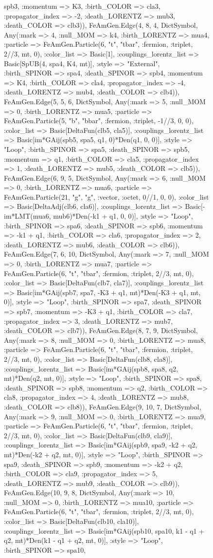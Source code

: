 \documentclass{revtex4}
\begin{document}
\begin{figure}[!htb]
\begin{center}
{spb3, :momentum => K3, :birth_COLOR => cla3, :propagator_index => -2, :death_LORENTZ => mub3, :death_COLOR => clb3)), FeAmGen.Edge(4, 8, 4, Dict{Symbol, Any}(:mark => 4, :null_MOM => k4, :birth_LORENTZ => mua4, :particle => FeAmGen.Particle(6, "t", "tbar", :fermion, :triplet, 2//3, mt, 0), :color_list => Basic[1], :couplings_lorentz_list => Basic[SpUB(4, spa4, K4, mt)], :style => "External", :birth_SPINOR => spa4, :death_SPINOR => spb4, :momentum => K4, :birth_COLOR => cla4, :propagator_index => -4, :death_LORENTZ => mub4, :death_COLOR => clb4)), FeAmGen.Edge(5, 5, 6, Dict{Symbol, Any}(:mark => 5, :null_MOM => 0, :birth_LORENTZ => mua5, :particle => FeAmGen.Particle(5, "b", "bbar", :fermion, :triplet, -1//3, 0, 0), :color_list => Basic[DeltaFun(clb5, cla5)], :couplings_lorentz_list => Basic[im*GAij(spb5, spa5, q1, 0)*Den(q1, 0, 0)], :style => "Loop", :birth_SPINOR => spa5, :death_SPINOR => spb5, :momentum => q1, :birth_COLOR => cla5, :propagator_index => 1, :death_LORENTZ => mub5, :death_COLOR => clb5)), FeAmGen.Edge(6, 9, 5, Dict{Symbol, Any}(:mark => 6, :null_MOM => 0, :birth_LORENTZ => mua6, :particle => FeAmGen.Particle(21, "g", "g", :vector, :octet, 0//1, 0, 0), :color_list => Basic[DeltaAdj(clb6, cla6)], :couplings_lorentz_list => Basic[-im*LMT(mua6, mub6)*Den(-k1 + q1, 0, 0)], :style => "Loop", :birth_SPINOR => spa6, :death_SPINOR => spb6, :momentum => -k1 + q1, :birth_COLOR => cla6, :propagator_index => 2, :death_LORENTZ => mub6, :death_COLOR => clb6)), FeAmGen.Edge(7, 6, 10, Dict{Symbol, Any}(:mark => 7, :null_MOM => 0, :birth_LORENTZ => mua7, :particle => FeAmGen.Particle(6, "t", "tbar", :fermion, :triplet, 2//3, mt, 0), :color_list => Basic[DeltaFun(clb7, cla7)], :couplings_lorentz_list => Basic[im*GAij(spb7, spa7, -K3 + q1, mt)*Den(-K3 + q1, mt, 0)], :style => "Loop", :birth_SPINOR => spa7, :death_SPINOR => spb7, :momentum => -K3 + q1, :birth_COLOR => cla7, :propagator_index => 3, :death_LORENTZ => mub7, :death_COLOR => clb7)), FeAmGen.Edge(8, 7, 9, Dict{Symbol, Any}(:mark => 8, :null_MOM => 0, :birth_LORENTZ => mua8, :particle => FeAmGen.Particle(6, "t", "tbar", :fermion, :triplet, 2//3, mt, 0), :color_list => Basic[DeltaFun(clb8, cla8)], :couplings_lorentz_list => Basic[im*GAij(spb8, spa8, q2, mt)*Den(q2, mt, 0)], :style => "Loop", :birth_SPINOR => spa8, :death_SPINOR => spb8, :momentum => q2, :birth_COLOR => cla8, :propagator_index => 4, :death_LORENTZ => mub8, :death_COLOR => clb8)), FeAmGen.Edge(9, 10, 7, Dict{Symbol, Any}(:mark => 9, :null_MOM => 0, :birth_LORENTZ => mua9, :particle => FeAmGen.Particle(6, "t", "tbar", :fermion, :triplet, 2//3, mt, 0), :color_list => Basic[DeltaFun(clb9, cla9)], :couplings_lorentz_list => Basic[im*GAij(spb9, spa9, -k2 + q2, mt)*Den(-k2 + q2, mt, 0)], :style => "Loop", :birth_SPINOR => spa9, :death_SPINOR => spb9, :momentum => -k2 + q2, :birth_COLOR => cla9, :propagator_index => 5, :death_LORENTZ => mub9, :death_COLOR => clb9)), FeAmGen.Edge(10, 9, 8, Dict{Symbol, Any}(:mark => 10, :null_MOM => 0, :birth_LORENTZ => mua10, :particle => FeAmGen.Particle(6, "t", "tbar", :fermion, :triplet, 2//3, mt, 0), :color_list => Basic[DeltaFun(clb10, cla10)], :couplings_lorentz_list => Basic[im*GAij(spb10, spa10, k1 - q1 + q2, mt)*Den(k1 - q1 + q2, mt, 0)], :style => "Loop", :birth_SPINOR => spa10, }
\end{center}
\end{figure}
\end{document}

